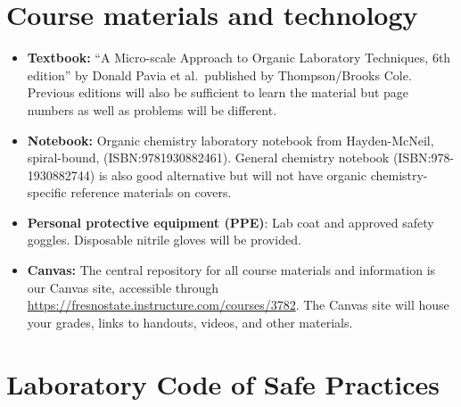 \hypertarget{course-materials-and-technology}{%
\section{Course materials and
technology}\label{course-materials-and-technology}}

\begin{itemize}
\tightlist
\item
  \textbf{Textbook:} ``A Micro-scale Approach to Organic Laboratory
  Techniques, 6th edition'' by Donald Pavia et al.~published by
  Thompson/Brooks Cole. Previous editions will also be sufficient to
  learn the material but page numbers as well as problems will be
  different.
\item
  \textbf{Notebook:} Organic chemistry laboratory notebook from
  Hayden-McNeil, spiral-bound, (ISBN:9781930882461). General chemistry
  notebook (ISBN:978-1930882744) is also good alternative but will not
  have organic chemistry-specific reference materials on covers.
\item
  \textbf{Personal protective equipment (PPE)}: Lab coat and approved
  safety goggles. Disposable nitrile gloves will be provided.
\item
  \textbf{Canvas:} The central repository for all course materials and
  information is our Canvas site, accessible through
  \url{https://fresnostate.instructure.com/courses/3782}. The Canvas
  site will house your grades, links to handouts, videos, and other
  materials.
\end{itemize}

\hypertarget{laboratory-code-of-safe-practices}{%
\section{Laboratory Code of Safe
Practices}\label{laboratory-code-of-safe-practices}}

